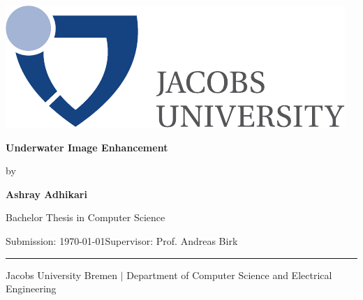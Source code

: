 \documentclass[a4paper,11pt,oneside]{article}
\newcommand{\mylastname}{Adhikari}
\newcommand{\myfirstname}{Ashray}
\newcommand{\myname}{\myfirstname{} \mylastname{}}
\newcommand{\mytitle}{Underwater Image Enhancement}
\newcommand{\mysupervisor}{Prof. Andreas Birk}
\begin{document}

  \thispagestyle{empty}

  \begin{flushright}
    \includegraphics[scale=0.8]{bsc-logo}
  \end{flushright}
  \vspace*{40mm}
  \begin{center}
    \huge
    \textbf{\mytitle}
  \end{center}
  \vspace*{4mm}
  \begin{center}
   \Large by
  \end{center}
  \vspace*{4mm}
  \begin{center}
    \LARGE
    \textbf{\myname}
  \end{center}
  \vspace*{20mm}
  \begin{center}
    \Large
    Bachelor Thesis in Computer Science
  \end{center}
  \vfill
  \begin{flushleft}
    \large
    Submission: \today \hfill Supervisor: \mysupervisor \\
    \rule{\textwidth}{1pt}
  \end{flushleft}
  \begin{center}
    Jacobs University Bremen $|$ Department of Computer Science and Electrical Engineering
  \end{center}

  \newpage
  \thispagestyle{empty}
\end{document}

